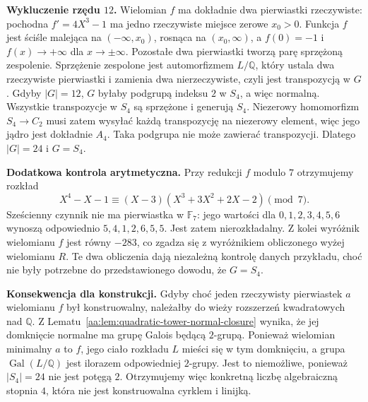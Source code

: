 \begin{uwaga}
\textbf{Wykluczenie rzędu $12$.}
Wielomian $f$ ma dokładnie dwa pierwiastki rzeczywiste:
pochodna $f'=4X^3-1$ ma jedno rzeczywiste miejsce
zerowe $x_0>0$. Funkcja $f$ jest ściśle malejąca
na $(-\infty,x_0)$, rosnąca na $(x_0,\infty)$,
a $f(0)=-1$ i $f(x)\to+\infty$ dla $x\to\pm\infty$.
Pozostałe dwa pierwiastki tworzą parę sprzężoną
zespolenie. Sprzężenie zespolone jest automorfizmem
$L/\mathbb Q$, który ustala dwa rzeczywiste
pierwiastki i zamienia dwa nierzeczywiste, czyli
jest transpozycją w $G$.
Gdyby $|G|=12$, $G$ byłaby podgrupą indeksu $2$
w $S_4$, a więc normalną. Wszystkie transpozycje
w $S_4$ są sprzężone i generują $S_4$.
Niezerowy homomorfizm $S_4\to C_2$ musi zatem
wysyłać każdą transpozycję na niezerowy element,
więc jego jądro jest dokładnie $A_4$.
Taka podgrupa nie może zawierać transpozycji.
Dlatego $|G|=24$ i $G=S_4$.

\textbf{Dodatkowa kontrola arytmetyczna.}
Przy redukcji $f$ modulo $7$ otrzymujemy rozkład
\[
 X^4-X-1\equiv (X-3)(X^3+3X^2+2X-2)\pmod 7.
\]
Sześcienny czynnik nie ma pierwiastka w $\mathbb F_7$:
jego wartości dla $0,1,2,3,4,5,6$ wynoszą
odpowiednio $5,4,1,2,6,5,5$. Jest zatem nierozkładalny.
Z kolei wyróżnik wielomianu $f$ jest równy $-283$,
co zgadza się z wyróżnikiem obliczonego wyżej
wielomianu $R$. Te dwa obliczenia dają niezależną
kontrolę danych przykładu, choć nie były potrzebne
do przedstawionego dowodu, że $G=S_4$.

\textbf{Konsekwencja dla konstrukcji.}
Gdyby choć jeden rzeczywisty pierwiastek $a$ wielomianu
$f$ był konstruowalny, należałby do wieży rozszerzeń
kwadratowych nad $\mathbb Q$.
Z Lematu~\ref{aa:lem:quadratic-tower-normal-closure} wynika,
że jej domknięcie normalne ma grupę Galois będącą
$2$-grupą. Ponieważ wielomian minimalny $a$ to $f$,
jego ciało rozkładu $L$ mieści się w tym domknięciu,
a grupa $\operatorname{Gal}(L/\mathbb Q)$ jest ilorazem
odpowiedniej $2$-grupy. Jest to niemożliwe,
ponieważ $|S_4|=24$ nie jest potęgą $2$.
Otrzymujemy więc konkretną liczbę algebraiczną stopnia
$4$, która nie jest konstruowalna cyrklem i linijką.
\end{uwaga}
